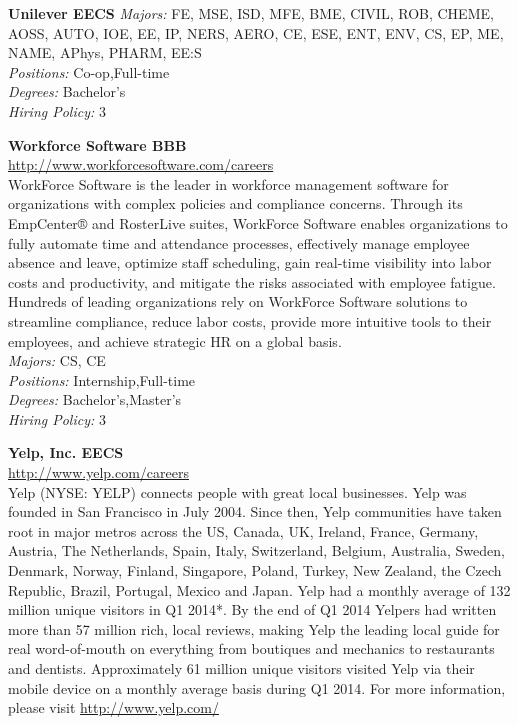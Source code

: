 \documentclass[twoside]{article}
\begin{document}
\begin{center}
\begin{multicols}{2}
\begin{minipage}{.95\columnwidth}{\Large\bf Unilever \hfill EECS}
    \emph{Majors:} FE, MSE, ISD, MFE, BME, CIVIL, ROB, CHEME, AOSS, AUTO, IOE, EE, IP, NERS, AERO, CE, ESE, ENT, ENV, CS, EP, ME, NAME, APhys, PHARM, EE:S\\
    \emph{Positions:} Co-op,Full-time\\
    \emph{Degrees:} Bachelor's\\
    \emph{Hiring Policy:} 3\\
\end{minipage}
 \begin{minipage}{.95\columnwidth}{\Large\bf Workforce Software \hfill BBB}\\
    \url{http://www.workforcesoftware.com/careers}\\
    WorkForce Software is the leader in workforce management software for organizations with complex policies and compliance concerns. Through its EmpCenter® and RosterLive suites, WorkForce Software enables organizations to fully automate time and attendance processes, effectively manage employee absence and leave, optimize staff scheduling, gain real-time visibility into labor costs and productivity, and mitigate the risks associated with employee fatigue. Hundreds of leading organizations rely on WorkForce Software solutions to streamline compliance, reduce labor costs, provide more intuitive tools to their employees, and achieve strategic HR on a global basis.\\
    \emph{Majors:} CS, CE\\
    \emph{Positions:} Internship,Full-time\\
    \emph{Degrees:} Bachelor's,Master's\\
    \emph{Hiring Policy:} 3\\
\end{minipage}
 \begin{minipage}{.95\columnwidth}{\Large\bf Yelp, Inc. \hfill EECS}\\
    \url{http://www.yelp.com/careers}\\
    Yelp (NYSE: YELP) connects people with great local businesses. Yelp was founded in San Francisco in July 2004. Since then, Yelp communities have taken root in major metros across the US, Canada, UK, Ireland, France, Germany, Austria, The Netherlands, Spain, Italy, Switzerland, Belgium, Australia, Sweden, Denmark, Norway, Finland, Singapore, Poland, Turkey, New Zealand, the Czech Republic, Brazil, Portugal, Mexico and Japan. Yelp had a monthly average of 132 million unique visitors in Q1 2014*. By the end of Q1 2014 Yelpers had written more than 57 million rich, local reviews, making Yelp the leading local guide for real word-of-mouth on everything from boutiques and mechanics to restaurants and dentists. Approximately 61 million unique visitors visited Yelp via their mobile device on a monthly average basis during Q1 2014. For more information, please visit \url{http://www.yelp.com/}\\

\end{minipage}
\end{multicols}
\end{center}
\end{document}
